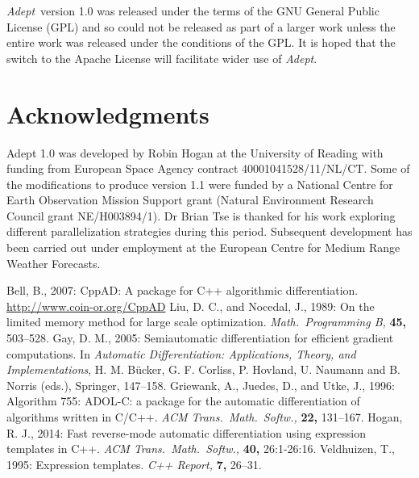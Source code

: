 \documentclass[a4,oneside]{book}
\def\Adept{\emph{Adept}}
\begin{document}
\Adept\ version 1.0 was released under the terms of the GNU General
Public License (GPL) and so could not be released as part of a larger
work unless the entire work was released under the conditions of the
GPL.  It is hoped that the switch to the Apache License will
facilitate wider use of \Adept.

\section*{Acknowledgments}
Adept 1.0 was developed by Robin Hogan at the University of Reading
with funding from European Space Agency contract
40001041528/11/NL/CT. Some of the modifications to produce version 1.1
were funded by a National Centre for Earth Observation Mission Support
grant (Natural Environment Research Council grant NE/H003894/1). Dr
Brian Tse is thanked for his work exploring different parallelization
strategies during this period. Subsequent development has been carried
out under employment at the European Centre for Medium Range Weather
Forecasts.

\begin{thebibliography}{00}
Bell, B., 2007: CppAD: A package for C++
algorithmic differentiation. \url{http://www.coin-or.org/CppAD}
% 
Liu, D. C., and Nocedal,
  J., 1989: On the limited memory method for large scale
optimization. \emph{Math.\ Programming B,} {\bf 45,} 503--528.
%
Gay, D. M., 2005: Semiautomatic
differentiation for efficient gradient computations.  In
\emph{Automatic Differentiation: Applications, Theory, and
  Implementations}, H. M. B\"ucker, G. F. Corliss, P.  Hovland,
U. Naumann and B. Norris (eds.), Springer, 147--158.
%
Griewank, A.,
  Juedes, D., and Utke, J., 1996:  Algorithm 755: ADOL-C: a package for the
automatic differentiation of algorithms written in C/C++. \textit{ACM
  Trans.\ Math.\ Softw.,} \textbf{22,} 131--167.
Hogan, R. J., 2014: Fast reverse-mode
  automatic differentiation using expression templates in
  C++. \textit{ACM Trans.\ Math.\ Softw.,} \textbf{40,} 26:1-26:16.
Veldhuizen, T., 1995:
Expression templates. {\it C++ Report,} {\bf 7,} 26--31.
\end{thebibliography}
\end{document}
